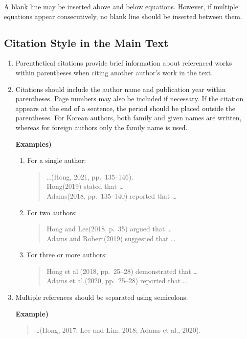 A blank line may be inserted above and below equations. However, if multiple equations appear consecutively, no blank line should be inserted between them.

\subsection{Citation Style in the Main Text}

\begin{enumerate}
    \item Parenthetical citations provide brief information about referenced works within parentheses when citing another author's work in the text.

    \item Citations should include the author name and publication year within parentheses. Page numbers may also be included if necessary. If the citation appears at the end of a sentence, the period should be placed outside the parentheses. For Korean authors, both family and given names are written, whereas for foreign authors only the family name is used.

    \textbf{Examples)}
    \begin{enumerate}
        \item[a.] For a single author:
        \begin{quote}
            \ldots (Hong, 2021, pp.\ 135--146). \\
            Hong(2019) stated that \ldots \\
            Adams(2018, pp.\ 135--140) reported that \ldots
        \end{quote}

        \item[b.] For two authors:
        \begin{quote}
            Hong and Lee(2018, p.\ 35) argued that \ldots \\
            Adams and Robert(2019) suggested that \ldots
        \end{quote}

        \item[c.] For three or more authors:
        \begin{quote}
            Hong et al.(2018, pp.\ 25--28) demonstrated that \ldots \\
            Adams et al.(2020, pp.\ 25--28) reported that \ldots
        \end{quote}
    \end{enumerate}

    \item Multiple references should be separated using semicolons.

    \textbf{Example)}
    \begin{quote}
        \ldots (Hong, 2017; Lee and Lim, 2018; Adams et al., 2020).
    \end{quote}
\end{enumerate}